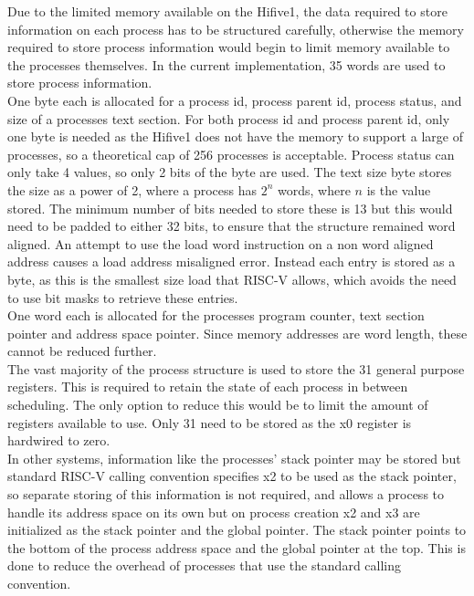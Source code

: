 Due to the limited memory available on the Hifive1, the data required to store information on each process has to be structured carefully, otherwise the memory required to store process information would begin to limit memory available to the processes themselves. In the current implementation, 35 words are used to store process information.
\\
One byte each is allocated for a process id, process parent id, process status, and size of a processes text section. For both process id and process parent id, only one byte is needed as the Hifive1 does not have the memory to support a large of processes, so a theoretical cap of 256 processes is acceptable. Process status can only take 4 values, so only 2 bits of the byte are used. The text size byte stores the size as a power of 2, where a process has \(2^n\) words, where \(n\) is the value stored. The minimum number of bits needed to store these is 13 but this would need to be padded to either 32 bits, to ensure that the structure remained word aligned. An attempt to use the load word instruction on a non word aligned address causes a load address misaligned error. Instead each entry is stored as a byte, as this is the smallest size load that RISC-V allows, which avoids the need to use bit masks to retrieve these entries.
\\
One word each is allocated for the processes program counter, text section pointer and address space pointer. Since memory addresses are word length, these cannot be reduced further.
\\
The vast majority of the process structure is used to store the 31 general purpose registers. This is required to retain the state of each process in between scheduling. The only option to reduce this would be to limit the amount of registers available to use. Only 31 need to be stored as the x0 register is hardwired to zero.
\\
In other systems, information like the processes' stack pointer may be stored but standard RISC-V calling convention specifies x2 to be used as the stack pointer, so separate storing of this information is not required, and allows a process to handle its address space on its own but on process creation x2 and x3 are initialized as the stack pointer and the global pointer. The stack pointer points to the bottom of the process address space and the global pointer at the top. This is done to reduce the overhead of processes that use the standard calling convention.
